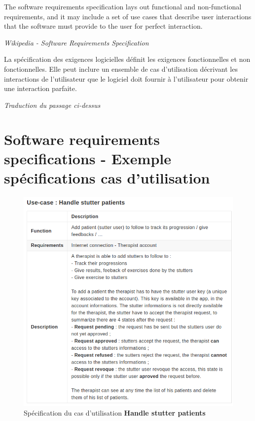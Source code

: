 \begin{appendices}
\begin{displayquote}
The software requirements specification lays out functional and non-functional requirements, and it may include a set of use cases that describe user interactions that the software must provide to the user for perfect interaction.
\end{displayquote}
\hspace*{\fill} \textit{Wikipedia - Software Requirements Specification}


\begin{displayquote}
La spécification des exigences logicielles définit les exigences fonctionnelles et non fonctionnelles. Elle peut inclure un ensemble de cas d'utilisation décrivant les interactions de l'utilisateur que le logiciel doit fournir à l'utilisateur pour obtenir une interaction parfaite.
\end{displayquote}
\hspace*{\fill} \textit{Traduction du passage ci-dessus}


\chapter{Software requirements specifications - Exemple spécifications cas d'utilisation}
\label{appendix:srs_example}
\begin{figure}[h]
  \includegraphics[width=1\linewidth]{content/imgs/srs_use_case_ex.png}
  \caption*{Spécification du cas d'utilisation \textbf{Handle stutter patients}}
\end{figure}





\end{appendices}
